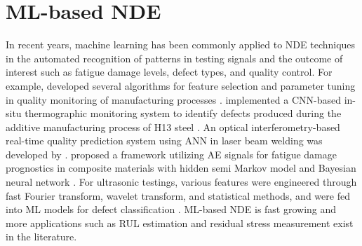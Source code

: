 \section{ML-based NDE}
In recent years, machine learning has been commonly applied to NDE techniques in the automated recognition of patterns in testing signals and the outcome of interest such as fatigue damage levels, defect types, and quality control. For example,  developed several algorithms for feature selection and parameter tuning in quality monitoring of manufacturing processes \cite{feature-selection-SHAO2013550,quality-control-GUO2016141,NAZIR2021806}.  implemented a CNN-based in-situ thermographic monitoring system to identify defects produced during the additive manufacturing process of H13 steel \cite{nde-ml-thermography-defect-Baumgartl2020}. An optical interferometry-based real-time quality prediction system using ANN in laser beam welding was developed by  \cite{nde-ml-interferometry-quality-Stad2020}.  proposed a framework utilizing AE signals for fatigue damage prognostics in composite materials with hidden semi Markov model and Bayesian neural network \cite{nde-ml-ae-fatigue-LOUTAS2017522}. For ultrasonic testings, various features were engineered through fast Fourier transform, wavelet transform, and statistical methods, and were fed into ML models for defect classification \cite{nde-lu-ml-defect-Sambath2011,nde-lu-ml-defect-s19194216}. ML-based NDE is fast growing and more applications such as RUL estimation and residual stress measurement exist in the literature. 

